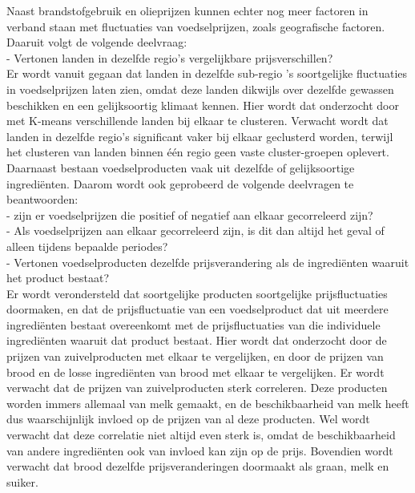 \documentclass{article}
\begin{document}
Naast brandstofgebruik en olieprijzen kunnen echter nog meer factoren in verband staan met fluctuaties van voedselprijzen, zoals geografische factoren. Daaruit volgt de volgende deelvraag:\\
- Vertonen landen in dezelfde regio’s vergelijkbare prijsverschillen? \\
Er wordt vanuit gegaan dat landen in dezelfde sub-regio 's soortgelijke fluctuaties in voedselprijzen laten zien, omdat deze landen dikwijls over dezelfde gewassen beschikken en een gelijksoortig klimaat kennen. Hier wordt dat onderzocht door met K-means  verschillende landen bij elkaar te clusteren. Verwacht wordt dat landen in dezelfde regio's significant vaker bij elkaar geclusterd worden, terwijl het clusteren van landen binnen één regio geen vaste cluster-groepen oplevert.  \\

\newpage
Daarnaast bestaan voedselproducten vaak uit dezelfde of gelijksoortige ingrediënten. Daarom wordt ook geprobeerd de volgende deelvragen te beantwoorden:\\
- zijn er voedselprijzen die positief of negatief aan elkaar gecorreleerd zijn? \\
- Als voedselprijzen aan elkaar gecorreleerd zijn, is dit dan altijd het geval of alleen tijdens bepaalde periodes?\\
- Vertonen voedselproducten dezelfde prijsverandering als de ingrediënten waaruit het product bestaat?\\
Er wordt verondersteld dat soortgelijke producten soortgelijke prijsfluctuaties doormaken, en dat de prijsfluctuatie van een voedselproduct dat uit meerdere ingrediënten bestaat overeenkomt met de prijsfluctuaties van die individuele ingrediënten waaruit dat product bestaat. Hier wordt dat onderzocht door de prijzen van zuivelproducten met elkaar te vergelijken, en door de prijzen van brood en de losse ingrediënten van brood met elkaar te vergelijken.
Er wordt verwacht dat de prijzen van zuivelproducten sterk correleren. Deze producten worden immers allemaal van melk gemaakt, en de beschikbaarheid van melk heeft dus waarschijnlijk invloed op de prijzen van al deze producten. Wel wordt verwacht dat deze correlatie niet altijd even sterk is, omdat de beschikbaarheid van andere ingrediënten ook van invloed kan zijn op de prijs.
Bovendien wordt verwacht dat brood dezelfde prijsveranderingen doormaakt als graan, melk en suiker. \\
\end{document}
